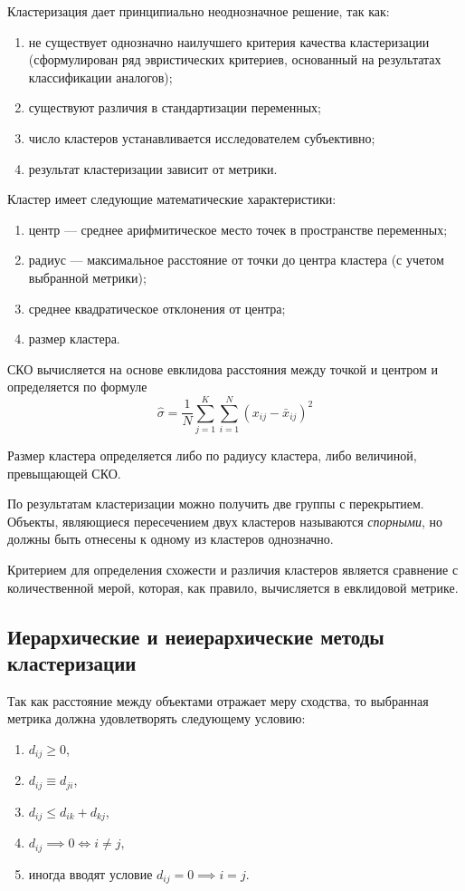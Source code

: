 \documentclass[12pt]{article}
\begin{document}
Кластеризация дает принципиально неоднозначное решение, так как:
\begin{enumerate}
    \item не существует однозначно наилучшего критерия качества кластеризации (сформулирован ряд эвристических критериев, основанный на результатах классификации аналогов);
    \item существуют различия в стандартизации переменных;
    \item число кластеров устанавливается исследователем субъективно;
    \item результат кластеризации зависит от метрики.\\
\end{enumerate}
Кластер имеет следующие математические характеристики: 
\begin{enumerate}
    \item центр --- среднее арифмитическое место точек в пространстве переменных; 
    \item радиус --- максимальное расстояние от точки до центра кластера (с учетом выбранной метрики);
    \item среднее квадратическое отклонения от центра;
    \item размер кластера.
\end{enumerate}

СКО вычисляется на основе евклидова расстояния между точкой и центром и определяется по формуле
\[ \hat{\sigma} = \frac{1}{N} \sum_{j=1}^K \sum_{i=1}^N (x_{ij} - \bar{x}_{ij})^2\]

Размер кластера определяется либо по радиусу кластера, либо величиной, превыщающей СКО.

По результатам кластеризации можно получить две группы с перекрытием. Объекты, являющиеся пересечением двух кластеров называются \emph{спорными}, но должны быть отнесены к одному из кластеров однозначно.

Критерием для определения схожести и различия кластеров является сравнение с количественной мерой, которая, как правило, вычисляется в евклидовой метрике.

\subsection{Иерархические и неиерархические методы кластеризации}
Так как расстояние между объектами отражает меру сходства, то выбранная метрика должна удовлетворять следующему условию:
\begin{enumerate}
    \item $d_{ij} \geq 0$,
    \item $d_{ij} \equiv d_{ji}$,
    \item $d_{ij} \leq d_{ik} + d_{kj}$,
    \item $d_{ij} \implies 0 \iff i \neq j$,
    \item иногда вводят условие $d_{ij} = 0 \implies i = j$.\\
\end{enumerate}
\end{document}
